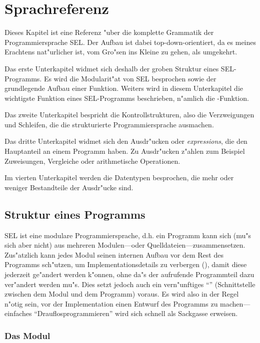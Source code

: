 \chapter{Sprachreferenz}

Dieses Kapitel ist eine Referenz "uber die komplette Grammatik
der Programmiersprache SEL. Der Aufbau ist dabei top-down-orientiert,
da es meines Erachtens nat"urlicher ist, vom Gro"sen ins Kleine
zu gehen, als umgekehrt.

Das erste Unterkapitel widmet sich deshalb der groben Struktur
eines SEL-Programms. Es wird die Modularit"at von SEL
besprochen sowie der grundlegende Aufbau einer Funktion. Weiters
wird in diesem Unterkapitel die wichtigste Funktion eines
SEL-Programms beschrieben, n"amlich die -Funktion.

Das zweite Unterkapitel bespricht die Kontrollstrukturen, also
die Verzweigungen und Schleifen, die die strukturierte
Programmiersprache ausmachen.

Das dritte Unterkapitel widmet sich den Ausdr"ucken oder
{\em expressions}, die den Hauptanteil an einem Programm haben. Zu
Ausdr"ucken z"ahlen zum Beispiel Zuweisungen, Vergleiche oder
arithmetische Operationen.

Im vierten Unterkapitel werden die Datentypen besprochen, die
mehr oder weniger Bestandteile der Ausdr"ucke sind.

\section{Struktur eines Programms}
SEL ist eine modulare
Programmiersprache, d.h. ein Programm kann sich (mu"s sich aber
nicht) aus mehreren Modulen---oder Quelldateien---zusammensetzen.
Zus"atzlich kann jedes Modul seinen internen Aufbau vor dem Rest
des Programms sch"utzen, um Implementationsdetails zu verbergen
(), damit diese jederzeit ge"andert werden
k"onnen, ohne da"s der aufrufende Programmteil dazu ver"andert
werden mu"s. Dies setzt jedoch auch ein vern"unftiges
"`"' (Schnittstelle zwischen dem Modul und dem
Programm) voraus. Es wird also in der Regel n"otig sein, vor der
Implementation einen Entwurf des Programms zu machen---einfaches
"`Drauflosprogrammieren"' wird sich schnell als Sackgasse
erweisen.

\subsection{Das Modul}

